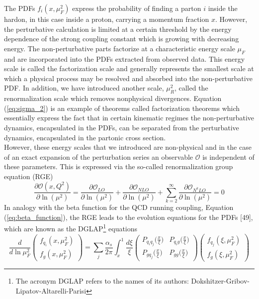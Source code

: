 The PDFs $f_i(x, \mu_F^2)$ express the probability of finding a parton $i$ inside the hardon, in this case inside a proton, carrying a momentum fraction $x$. However, the perturbative calculation is limited at a certain threshold by the energy dependence of the strong coupling constant which is growing with decreasing energy. The non-perturbative parts factorize at a characteristic energy scale $\mu_F$ and are incorporated into the PDFs extracted from observed data. This energy scale is called the factorization scale and generally represents the smallest scale at which a physical process may be resolved and absorbed into the non-perturbative PDF. In addition, we have introduced another scale, $\mu_R^2$, called the renormalization scale which removes nonphysical divergences. Equation (\ref{eq:sigma_2}) is an example of theorems called factorization theorems \cite{55} which essentially express the fact that in certain kinematic regimes the non-perturbative dynamics, encapsulated in the PDFs, can be separated from the perturbative dynamics, encapsulated in the partonic cross section.\\
\indent However, these energy scales that we introduced are non-physical and in the case of an exact expansion of the perturbation series an observable $\mathscr{O}$ is independent of these parameters. This is expressed via the so-called renormalization group equation (RGE)
\begin{equation}
    \frac{\partial\mathscr{O}(x,Q^2)}{\partial\ln(\mu^2)}= \frac{\partial\mathscr{O}_{LO}}{\partial\ln(\mu^2)} + \frac{\partial\mathscr{O}_{NLO}}{\partial\ln(\mu^2)} + \sum_{k=2}^{\infty} \frac{\partial\mathscr{O}_{N^kLO}}{\partial\ln(\mu^2)} = 0
\end{equation}
In analogy with the beta function for the QCD running coupling, Equation (\ref{eq:beta_function}), the RGE leads to the evolution equations for the PDFs [49], which are known as the DGLAP\footnote{The acronym DGLAP refers to the names of its authors: Dokshitzer-Gribov-Lipatov-Altarelli-Parisi} equations \cite{56,57,58,59}
\begin{equation}
    \frac{d}{d\ln\mu_F^2} \begin{pmatrix}
        f_{q_i}(x, \mu_F^2) \\
        f_g(x,\mu_F^2)
    \end{pmatrix} = \sum_j \frac{\alpha_s}{2\pi}\int_x^1 \frac{d\xi}{\xi}\begin{pmatrix}
        P_{q_iq_j}\big(\frac{x}{\xi}\big) & P_{q_ig}\big(\frac{x}{\xi}\big) \\
        P_{gq_j}\big(\frac{x}{\xi}\big) & P_{gg}\big(\frac{x}{\xi}\big)
    \end{pmatrix}\begin{pmatrix}
        f_{q_j}(\xi,\mu_F^2) \\
        f_g(\xi, \mu_F^2)
    \end{pmatrix}
\end{equation}
